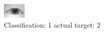 \begin{figure}[h!]
\begin{center}
\includegraphics[width=0.60\columnwidth]{figures/ID1018_class_1_target_2.png}
\end{center}
\caption{ Classification: 1 actual target: 2}
\label{fig:ID1018_class_1_target_2}
\end{figure}
